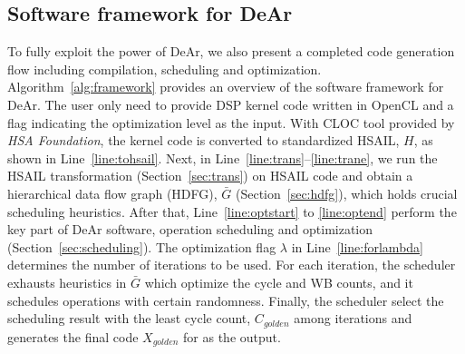 \subsection{Software framework for DeAr}
\label{sec:swframework}
To fully exploit the power of DeAr, we also present a completed code generation flow including compilation, scheduling and optimization.
Algorithm~\ref{alg:framework} provides an overview of the software framework for DeAr. 
The user only need to provide DSP kernel code written in OpenCL and a flag indicating the optimization level as the input.
With CLOC \cite{cloc} tool provided by \textit{HSA Foundation}, the kernel code is converted to standardized HSAIL, $H$, as shown in Line~\ref{line:tohsail}.
Next, in Line~\ref{line:trans}--\ref{line:trane}, 
we run the HSAIL transformation (Section~\ref{sec:trans}) on HSAIL code and obtain a hierarchical data flow graph (HDFG), 
$\bar{G}$ (Section~\ref{sec:hdfg}), which holds crucial scheduling heuristics.
After that, Line~\ref{line:optstart} to \ref{line:optend} perform the key part of DeAr software, 
operation scheduling and optimization (Section~\ref{sec:scheduling}).
The optimization flag $\lambda$ in Line~\ref{line:forlambda} determines the number of iterations to be used.
For each iteration, the scheduler exhausts heuristics in $\bar{G}$ which optimize the cycle and WB counts, 
and it schedules operations with certain randomness.
Finally, the scheduler select the scheduling result with the least cycle count, 
$C_{golden}$ among iterations and generates the final code $X_{golden}$ for as the output.
